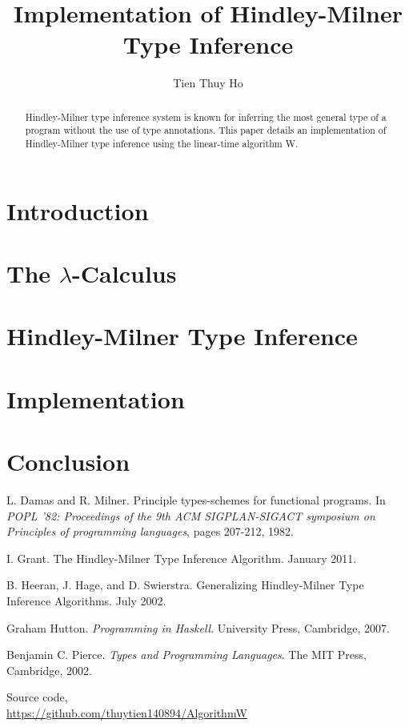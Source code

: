 \documentclass[11pt]{article}
\title{\bf Implementation of Hindley-Milner \\ Type Inference}
\author{Tien Thuy Ho}
\date{}
\begin{document}
\maketitle

\begin{abstract}
Hindley-Milner type inference system is known for inferring the most general type of a program 
without the use of type annotations. This paper details an implementation of Hindley-Milner type inference 
using the linear-time algorithm W.
\end{abstract}

\section{Introduction} 
\section{The $\lambda$-Calculus} 
\section{Hindley-Milner Type Inference} 
\section{Implementation} 
\section{Conclusion} 

\appendix


\begin{thebibliography}{9}
    L. Damas and R. Milner. 
    Principle types-schemes for functional programs. 
    In \textit{POPL ’82: Proceedings of the 9th ACM SIGPLAN-SIGACT symposium on Principles of programming languages}, 
    pages 207-212, 1982.

    I. Grant.
    The Hindley-Milner Type Inference Algorithm.
    January 2011.

    B. Heeran, J. Hage, and D. Swierstra.
    Generalizing Hindley-Milner Type Inference Algorithms.
    July 2002.

    Graham Hutton. 
    \textit{Programming in Haskell}. 
    University Press, Cambridge, 2007.

    Benjamin C. Pierce. 
    \textit{Types and Programming Languages}. 
    The MIT Press, Cambridge, 2002.

    Source code, \\
    \url{https://github.com/thuytien140894/AlgorithmW}
\end{thebibliography}
\end{document}
